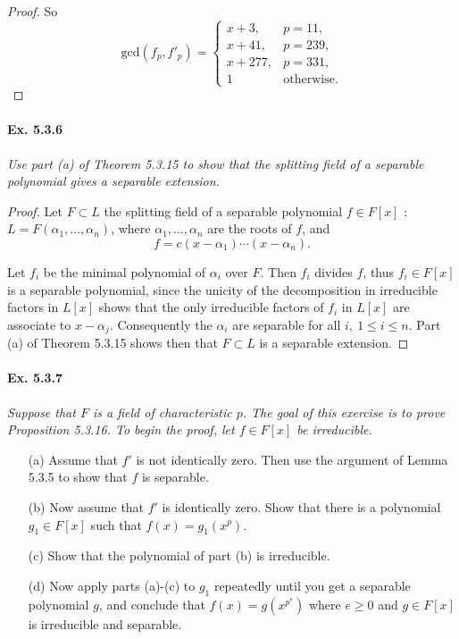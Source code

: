 \documentclass[11pt,a4paper]{article}
\begin{document}
\begin{proof}
\bigskip

So
$$
\mathrm{gcd}(f_p,f'_p) = 
\left\{
\begin{array}{ll}
  x+3,      & p = 11,    \\
  x + 41,  & p = 239,   \\
  x + 277, &  p = 331,  \\ 
  1  & \mathrm{otherwise.}
\end{array}
\right.
$$
\end{proof}

\paragraph{Ex. 5.3.6}

{\it Use part (a) of Theorem 5.3.15 to show that the splitting field of a separable polynomial gives a separable extension.
}

\begin{proof}
Let $F\subset L$ the splitting field of a separable polynomial $f \in F[x]$ : $L=F(\alpha_1,\ldots,\alpha_n)$, where $\alpha_1,\ldots,\alpha_n$ are the roots of $f$, and
$$f = c(x-\alpha_1)\cdots(x-\alpha_n).$$

Let $f_i$ be the minimal polynomial of $\alpha_i$ over $F$. Then $f_i$ divides $f$, thus $f_i \in F[x]$ is a separable polynomial, since the unicity of the decomposition in irreducible factors in $L[x]$ shows that the only irreducible factors of $f_i$ in $L[x]$ are associate to $x-\alpha_j$. Consequently the $\alpha_i$ are separable for all $i,\ 1\leq i \leq n$. Part (a) of Theorem 5.3.15 shows then that $F\subset L$ is a separable extension.
\end{proof}

\paragraph{Ex. 5.3.7}

{\it Suppose that $F$ is a field of characteristic $p$. The goal of this exercise is to prove Proposition 5.3.16. To begin the proof, let $f \in F[x]$ be irreducible.
\begin{enumerate}
\item[(a)] Assume that $f'$ is not identically zero. Then use the argument of Lemma 5.3.5 to show that $f$ is separable.
\item[(b)] Now assume that $f'$ is identically zero. Show that there is a polynomial $g_1 \in F[x]$ such that $f(x) = g_1(x^p)$.
\item[(c)] Show that the polynomial of part (b) is irreducible.
\item[(d)] Now apply parts (a)-(c) to $g_1$ repeatedly until you get a separable polynomial $g$, and conclude that $f(x) = g(x^{p^e})$ where $e\geq 0$ and $g\in F[x]$ is irreducible and separable.
\end{enumerate}
}
\end{document}
